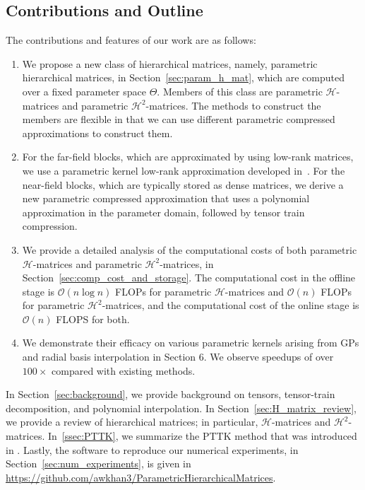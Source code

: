 \documentclass[final,3p,times]{elsarticle}
\newcommand{\mc}[1]{\mathcal{#1}}
\begin{document}
\subsection{Contributions and Outline} The  contributions and features of our work are as follows:
\begin{enumerate}
    \item  We propose a new class of hierarchical matrices, namely, parametric hierarchical matrices, in Section~\ref{sec:param_h_mat}, which are computed over a fixed parameter space $\Theta$. Members of this class are parametric $\mc{H}$-matrices and parametric $\mc{H}^{2}$-matrices. The methods to construct the members are flexible in that we can use different parametric compressed approximations to construct them.
    \item For the far-field blocks, which are approximated by  using low-rank matrices, we use a parametric kernel low-rank approximation developed in~\cite{khan2025parametric}. For the near-field blocks, which are typically stored as dense matrices, we derive a new parametric compressed approximation that  uses a polynomial approximation in the parameter domain, followed by tensor train compression. 
    \item We provide a detailed analysis of the computational costs of both parametric $\mc{H}$-matrices and parametric $\mc{H}^{2}$-matrices, in Section~\ref{sec:comp_cost_and_storage}. The computational cost in the offline stage is $\mc{O}(n\log n)$ FLOPs for parametric $\mc{H}$-matrices and $\mc{O}(n)$ FLOPs for parametric $\mc{H}^{2}$-matrices, and the computational cost of the online stage is $\mc{O}(n)$ FLOPS for both. 
    \item We demonstrate their efficacy on various parametric kernels arising from GPs and radial basis interpolation in Section 6. {We observe speedups of over $100\times$ compared with existing methods.}
\end{enumerate}
In Section~\ref{sec:background}, we provide background on tensors, tensor-train decomposition, and polynomial interpolation. In Section~\ref{sec:H_matrix_review}, we provide a review of hierarchical matrices; in particular, $\mc{H}$-matrices and $\mc{H}^{2}$-matrices. In~\ref{ssec:PTTK}, we summarize the PTTK method that was introduced in \cite{khan2025parametric}. Lastly, the software to reproduce our numerical experiments, in Section~\ref{sec:num_experiments}, is given in \url{https://github.com/awkhan3/ParametricHierarchicalMatrices}. 
\end{document}

